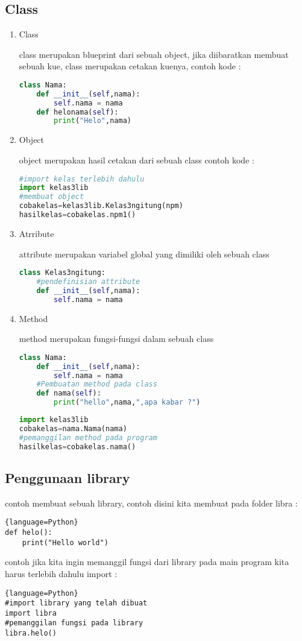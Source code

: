 \subsection{Class}
\begin{enumerate}
\item Class
\par 
class merupakan blueprint dari sebuah object, jika diibaratkan membuat sebuah kue, class merupakan cetakan kuenya, contoh kode :
\begin{lstlisting}[language=Python]
class Nama:
    def __init__(self,nama):
        self.nama = nama
    def helonama(self):
        print("Helo",nama)
\end{lstlisting}

\item Object
\par 
object merupakan hasil cetakan dari sebuah class contoh kode :
\begin{lstlisting}[language=Python]
#import kelas terlebih dahulu
import kelas3lib
#membuat object
cobakelas=kelas3lib.Kelas3ngitung(npm) 
hasilkelas=cobakelas.npm1()
\end{lstlisting}

\item Atrribute
\par 
attribute merupakan variabel global yang dimiliki oleh sebuah class
\begin{lstlisting}[language=Python]
class Kelas3ngitung:
	#pendefinisian attribute
    def __init__(self,nama):
        self.nama = nama
\end{lstlisting}

\item Method
\par 
method merupakan fungsi-fungsi dalam sebuah class
\begin{lstlisting}[language=Python]
class Nama:
    def __init__(self,nama):
        self.nama = nama
    #Pembuatan method pada class
    def nama(self):
       	print("hello",nama,",apa kabar ?")
\end{lstlisting}

\begin{lstlisting}[language=Python]
import kelas3lib
cobakelas=nama.Nama(nama) 
#pemanggilan method pada program
hasilkelas=cobakelas.nama()
\end{lstlisting}
\end{enumerate}

\subsection{Penggunaan library}
\par 
contoh membuat sebuah library, contoh disini kita membuat pada folder libra :
\begin{lstlisting}{language=Python}
def helo():
    print("Hello world")
\end{lstlisting}
contoh jika kita ingin memanggil fungsi dari library pada main program kita harus terlebih dahulu import :
\begin{lstlisting}{language=Python}
#import library yang telah dibuat
import libra
#pemanggilan fungsi pada library
libra.helo()
\end{lstlisting}

